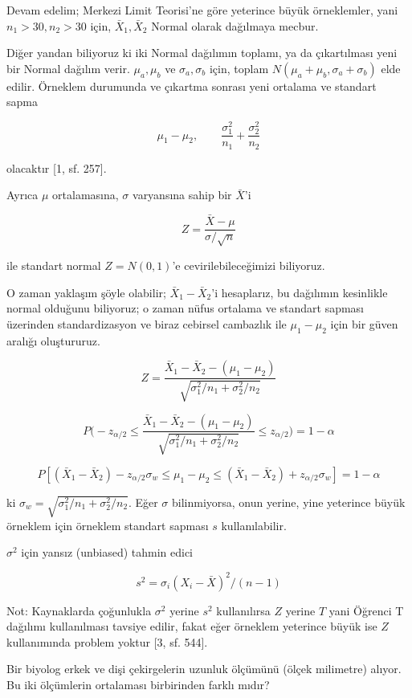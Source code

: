 \documentclass[12pt,fleqn]{article}\usepackage{../../common}
\begin{document}
Devam edelim; Merkezi Limit Teorisi'ne göre yeterince büyük örneklemler,
yani $n_1>30,n_2>30$ için, $\bar{X}_1,\bar{X}_2$ Normal olarak dağılmaya
mecbur. 

Diğer yandan biliyoruz ki iki Normal dağılımın toplamı, ya da çıkartılması
yeni bir Normal dağılım verir. $\mu_a,\mu_b$ ve $\sigma_a,\sigma_b$ için,
toplam $N(\mu_a+\mu_b, \sigma_a+\sigma_b)$ elde edilir. Örneklem durumunda
ve çıkartma sonrası yeni ortalama ve standart sapma

$$ \mu_1-\mu_2, \qquad \frac{\sigma_1^2}{n_1} + \frac{\sigma_2^2}{n_2}$$

olacaktır [1, sf. 257].

Ayrıca $\mu$ ortalamasına, $\sigma$ varyansına sahip bir $\bar{X}$'i

$$ Z = \frac{\bar{X}-\mu}{\sigma/\sqrt{n}} $$

ile standart normal $Z = N(0,1)$'e cevirilebileceğimizi biliyoruz. 

O zaman yaklaşım şöyle olabilir; $\bar{X}_1-\bar{X}_2$'i hesaplarız, bu
dağılımın kesinlikle normal olduğunu biliyoruz; o zaman nüfus ortalama ve
standart sapması üzerinden standardizasyon ve biraz cebirsel cambazlık ile
$\mu_1-\mu_2$ için bir güven aralığı oluştururuz.

$$ 
Z =
\frac{\bar{X}_1-\bar{X}_2 - (\mu_1-\mu_2)}
{\sqrt{\sigma_1^2/n_1 + \sigma_2^2/n_2}}
$$


$$ 
P \bigg(
-z_{\alpha/2} \le 
\frac{\bar{X}_1-\bar{X}_2 - (\mu_1-\mu_2)} {\sqrt{\sigma_1^2/n_1 + \sigma_2^2/n_2}} \le
z_{\alpha/2} 
\bigg) = 1-\alpha
 $$

$$ 
P[
(\bar{X}_1 - \bar{X}_2) - z_{\alpha/2}\sigma_w \le
\mu_1-\mu_2 \le
(\bar{X}_1 - \bar{X}_2) + z_{\alpha/2}\sigma_w 
] = 1-\alpha
$$

ki  $\sigma_w = \sqrt{\sigma_1^2/n_1 + \sigma_2^2/n_2}$. Eğer $\sigma$ 
bilinmiyorsa, onun yerine, yine yeterince  büyük örneklem için örneklem 
standart sapması $s$ kullanılabilir. 

$\sigma^2$ için yansız (unbiased) tahmin edici 

$$ s^2 = \sigma_i (X_i-\bar{X})^2 / (n-1) $$

Not: Kaynaklarda çoğunlukla $\sigma^2$ yerine $s^2$ kullanılırsa $Z$ yerine
$T$ yani Öğrenci T dağılımı kullanılması tavsiye edilir, fakat eğer
örneklem yeterince büyük ise $Z$ kullanımında problem yoktur [3, sf. 544].

Bir biyolog erkek ve dişi çekirgelerin uzunluk ölçümünü (ölçek milimetre)
alıyor. Bu iki ölçümlerin ortalaması birbirinden farklı mıdır?
\end{document}
